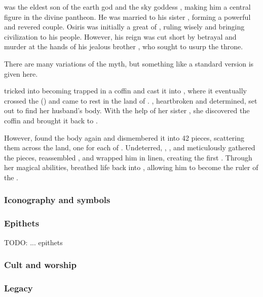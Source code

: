  was the eldest son of the earth god  and the sky goddess , making him a central figure in the divine pantheon. He was married to his sister , forming a powerful and revered couple. Osiris was initially a great  of , ruling wisely and bringing civilization to his people. However, his reign was cut short by betrayal and murder at the hands of his jealous brother , who sought to usurp the throne.

There are many variations of the myth, but something like a standard version is given here.

 tricked  into becoming trapped in a coffin and cast it into , where it eventually crossed the  () and came to rest in the land of . , heartbroken and determined, set out to find her husband's body. With the help of her sister , she discovered the coffin and brought it back to .

However,  found the body again and dismembered it into 42 pieces, scattering them across the land, one for each  of . Undeterred, , , and  meticulously gathered the pieces, reassembled , and wrapped him in linen, creating the first . Through her magical abilities,  breathed life back into , allowing him to become the ruler of the .

\subsubsection*{Iconography and symbols}

\subsubsection*{Epithets}

TODO: ... epithets

\subsubsection*{Cult and worship}

\subsubsection*{Legacy}


